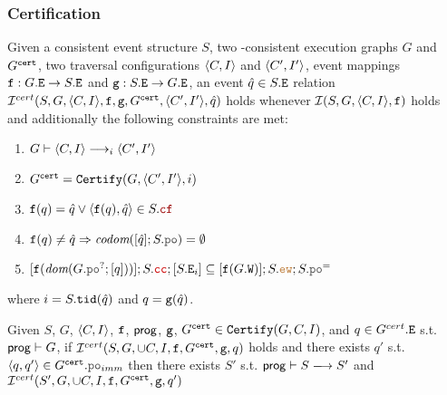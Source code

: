 \documentclass[12pt]{article}
\begin{document}

\subsubsection{Certification}

\begin{definition}
  Given a consistent event structure $S$,
  two \imm-consistent execution graphs $G$ and $G^{{\mathtt{cert}}}$,
  two traversal configurations $\langle C, I \rangle$ and $\langle C', I' \rangle$,
  event mappings ${\mathtt{f}} : G.{\mathtt{E}} \rightarrow S.{\mathtt{E}}$ and ${\mathtt{g}} : S.{\mathtt{E}} \rightarrow G.{\mathtt{E}}$,
  an event $\hat{q} \in S.{\mathtt{E}}$ 
  relation $\mathcal{I}^{cert}(S, G, \langle C, I \rangle, {\mathtt{f}}, {\mathtt{g}}, G^{{\mathtt{cert}}}, \langle C', I' \rangle, \hat{q})$ holds 
  whenever $\mathcal{I}(S, G, \langle C, I \rangle, {\mathtt{f}})$ holds and additionally 
  the following constraints are met:
  \begin{enumerate}[label={$\boldsymbol{\simRc_{\arabic*}}$.},align=left]

    \item \label{item:simc-tr}
    $G \vdash \langle C, I \rangle \longrightarrow_{i} \langle C', I' \rangle$

    \item \label{item:simc-cert}
    $G^{{\mathtt{cert}}} = {\mathtt{Certify}}(G, \langle C', I' \rangle, i)$

    \item \label{item:simc-q}
    $\f(q) = \hat{q} \vee \tup{\f(q), \hat{q}} \in S.\lCF$ 
    
    \item \label{item:simc-po-q}
    $\f(q) \neq \hat{q} \Rightarrow \codom{[\hat{q}];S.\lPO} = \emptyset$

    \item \label{item:simc-cc}
    $[\f(\dom{G.\lPO^?;[q]})];S.\lCC;[S.\lEi{i}] \subseteq
      [\f(G.\lW)];S.\lEW;S.\lPO^=
    $
    
  \end{enumerate}

  where $i = S.{\mathtt{tid}}(\hat{q})$ and $q = {\mathtt{g}}(\hat{q})$.
\end{definition}

\begin{lemma}
  Given $S$, $G$, $\langle C, I \rangle$, ${\mathtt{f}}$, $\mathsf{prog}$,
  ${\mathtt{g}}$, $G^{{\mathtt{cert}}} \in {\mathtt{Certify}}(G, C, I)$, and $q \in G^{cert}.{\mathtt{E}}$
  s.t. $\mathsf{prog} \vdash G$,
  if $\mathcal{I}^{cert}(S, G, \cup{C, I}, {\mathtt{f}}, G^{{\mathtt{cert}}}, {\mathtt{g}}, q)$ holds 
  and there exists $q'$ s.t. $\tup{q, q'} \in G^{\cert}.\lPO_{imm}$
  then there exists $S'$ s.t. $\Prog \vdash S \esstep{} S'$ and
  $\mathcal{I}^{cert}(S', G, \cup{C, I}, {\mathtt{f}}, G^{{\mathtt{cert}}}, {\mathtt{g}}, q')$
\end{lemma}
\end{document}
